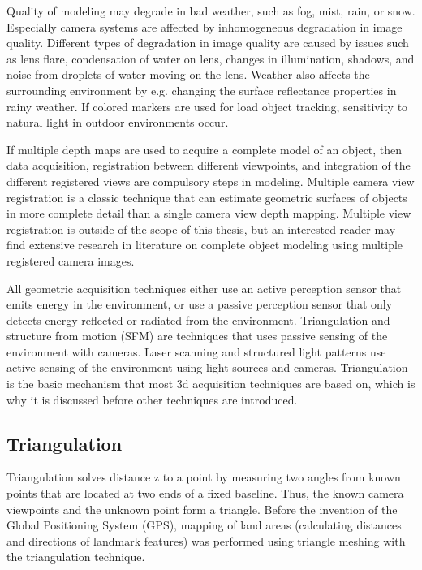 \documentclass[12pt,a4paper,oneside,pdftex]{report}
\begin{document}
Quality of modeling may degrade in bad weather, such as fog, mist, rain, or snow. Especially camera systems are affected by inhomogeneous degradation in image quality. Different types of degradation in image quality are caused by issues such as lens flare, condensation of water on lens, changes in illumination, shadows, and noise from droplets of water moving on the lens. Weather also affects the surrounding environment by e.g. changing the surface reflectance properties in rainy weather. If colored markers are used for load object tracking, sensitivity to natural light in outdoor environments occur. \citep{Kawai12} 

If multiple depth maps are used to acquire a complete model of an object, then data acquisition, registration between different viewpoints, and integration of the different registered views are compulsory steps in modeling.  Multiple camera view registration is a classic technique that can estimate geometric surfaces of objects in more complete detail than a single camera view depth mapping. Multiple view registration is outside of the scope of this thesis, but an interested reader may find extensive research in literature on complete object modeling using multiple registered camera images. \citep{Chen91}

All geometric acquisition techniques either use an active perception sensor that emits energy in the environment, or use a passive perception sensor that only detects energy reflected or radiated from the environment. Triangulation and structure from motion (SFM) are techniques that uses passive sensing of the environment with cameras. Laser scanning and structured light patterns use active sensing of the environment using light sources and cameras.
Triangulation is the basic mechanism that most 3d acquisition techniques are based on, which is why it is discussed before other techniques are introduced.

\subsection{Triangulation}
\label{subsection:triangulation}

Triangulation solves distance z to a point by measuring two angles from known points that are located at two ends of a fixed baseline. Thus, the known camera viewpoints and the unknown point form a triangle. Before the invention of the Global Positioning System (GPS), mapping of land areas (calculating distances and directions of landmark features) was performed using triangle meshing with the triangulation technique.
\end{document}
